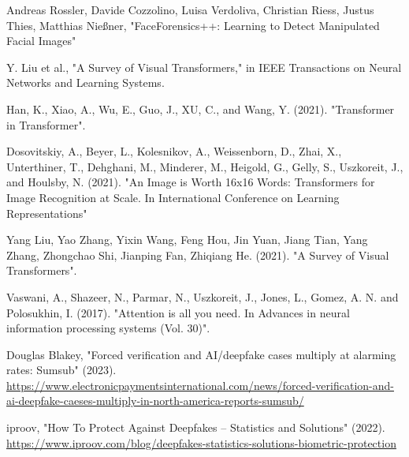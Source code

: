 \begin{thebibliography}{99}

     Andreas Rossler, Davide Cozzolino, Luisa Verdoliva, Christian Riess, Justus Thies, Matthias Nießner, "FaceForensics++: Learning to Detect Manipulated Facial Images"










     Y. Liu et al., "A Survey of Visual Transformers," in IEEE Transactions on Neural Networks and Learning Systems.

     Han, K., Xiao, A., Wu, E., Guo, J., XU, C., and Wang, Y. (2021). "Transformer in Transformer". 

     Dosovitskiy, A., Beyer, L., Kolesnikov, A., Weissenborn, D., Zhai, X., Unterthiner, T., Dehghani, M., Minderer, M., Heigold, G., Gelly, S., Uszkoreit, J., and Houlsby, N. (2021). "An Image is Worth 16x16 Words: Transformers for Image Recognition at Scale. In International Conference on Learning Representations"

     Yang Liu, Yao Zhang, Yixin Wang, Feng Hou, Jin Yuan,
    Jiang Tian, Yang Zhang, Zhongchao Shi, Jianping Fan, Zhiqiang He. (2021). "A Survey of Visual Transformers".

     Vaswani, A., Shazeer, N., Parmar, N., Uszkoreit, J., Jones, L., Gomez, A. N. and Polosukhin, I. (2017). "Attention is all you need. In Advances in neural information processing systems (Vol. 30)".

     Douglas Blakey, "Forced verification and AI/deepfake cases multiply at alarming rates: Sumsub" (2023). \url{https://www.electronicpaymentsinternational.com/news/forced-verification-and-ai-deepfake-caeses-multiply-in-north-america-reports-sumsub/}

     iproov, "How To Protect Against Deepfakes – Statistics and Solutions" (2022). \url{https://www.iproov.com/blog/deepfakes-statistics-solutions-biometric-protection} 
\end{thebibliography}
